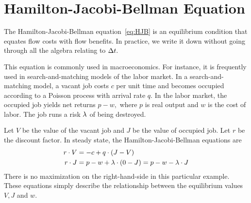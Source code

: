 \documentclass[letterpaper,12pt,leqno]{article}
\begin{document}
\section{Hamilton-Jacobi-Bellman Equation}

The Hamilton-Jacobi-Bellman equation~\eqref{eq:HJB} is an equilibrium condition that equates flow costs with flow benefits. In practice, we write it down without going through all the algebra relating to $\Delta t.$ 

This equation is commonly used in macroeconomics. For instance, it is frequently used in search-and-matching models of the labor market. In a search-and-matching model, a vacant job costs $c$ per unit time and becomes occupied according to a Poisson process with arrival rate $q.$ In the labor market, the occupied job yields net returns $p-w,$ where $p$ is real output and $w$ is the cost of labor. The job runs a risk $\lambda $ of being destroyed. 

Let $V$ be the value of the vacant job and $J$ be the value of occupied job. Let $r$ be the discount factor. In steady state, the Hamilton-Jacobi-Bellman equations are
\begin{align*}
r\cdot V &=-c+q \cdot  \left( J-V \right) \\
r\cdot J &=p-w+ \lambda \cdot \left( 0-J \right)=p-w-\lambda \cdot J
\end{align*}
There is no maximization on the right-hand-side in this particular example. These equations simply describe the relationship between the equilibrium values $V,J$ and $w$. 
\end{document}
